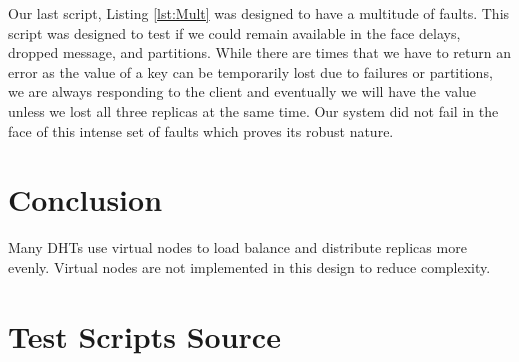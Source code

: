 \documentclass[11pt]{article}
\begin{document}
Our last script, Listing \ref{lst:Mult} was designed to have a multitude of faults. This script was designed to test if we could remain available in the face delays, dropped message, and partitions. While there are times that we have to return an error as the value of a key can be temporarily lost due to failures or partitions, we are always responding to the client and eventually we will have the value unless we lost all three replicas at the same time. Our system did not fail in the face of this intense set of faults which proves its robust nature.



\section{Conclusion}\label{sec:Conc}
Many DHTs use virtual nodes to load balance and distribute replicas more evenly. Virtual nodes are not implemented in this design to reduce complexity.

\clearpage

\printbibliography

\clearpage

\appendix

\section{Test Scripts Source}
\end{document}
